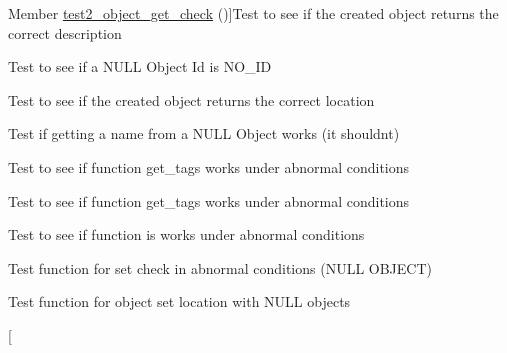 \begin{DoxyRefList}
\hypertarget{test__test000163}{}%
Member \hyperlink{object__test_8h_a0a46a923bd913c88dc697341d19cfb2b}{test2\+\_\+object\+\_\+get\+\_\+check} ()]Test to see if the created object returns the correct description  
\item[\label{test__test000159}%
\hypertarget{test__test000159}{}%
Member \hyperlink{object__test_8h_a1ff250f0f43297f57fcce1f3a6ae490b}{test2\+\_\+object\+\_\+get\+\_\+id} ()]Test to see if a N\+U\+LL Object Id is N\+O\+\_\+\+ID  
\item[\label{test__test000161}%
\hypertarget{test__test000161}{}%
Member \hyperlink{object__test_8h_aa8e3d1f2c80097572d9a453737d8cd44}{test2\+\_\+object\+\_\+get\+\_\+location} ()]Test to see if the created object returns the correct location  
\item[\label{test__test000157}%
\hypertarget{test__test000157}{}%
Member \hyperlink{object__test_8h_abdfafbc7b8588d3dcdb05fd2beb2397e}{test2\+\_\+object\+\_\+get\+\_\+name} ()]Test if getting a name from a N\+U\+LL Object works (it shouldn\textquotesingle{}t)  
\item[\label{test__test000167}%
\hypertarget{test__test000167}{}%
Member \hyperlink{object__test_8h_a9cca45e17438fe1a0948c2e9c75f81d3}{test2\+\_\+object\+\_\+get\+\_\+tags} ()]Test to see if function get\+\_\+tags works under abnormal conditions  
\item[\label{test__test000169}%
\hypertarget{test__test000169}{}%
Member \hyperlink{object__test_8h_a84f299de87c8e600980581758183115d}{test2\+\_\+object\+\_\+get\+\_\+tags\+\_\+number} ()]Test to see if function get\+\_\+tags works under abnormal conditions  
\item[\label{test__test000171}%
\hypertarget{test__test000171}{}%
Member \hyperlink{object__test_8h_ab9377287e979599b63de60a17b6023bb}{test2\+\_\+object\+\_\+is} ()]Test to see if function is works under abnormal conditions  
\item[\label{test__test000155}%
\hypertarget{test__test000155}{}%
Member \hyperlink{object__test_8h_a16f5685f75ace0aaaeef2b296d64221d}{test2\+\_\+object\+\_\+set\+\_\+check} ()]Test function for set check in abnormal conditions (N\+U\+LL O\+B\+J\+E\+CT)  
\item[\label{test__test000152}%
\hypertarget{test__test000152}{}%
Member \hyperlink{object__test_8h_a552de466dc09eaef60eff5835455fbb6}{test2\+\_\+object\+\_\+set\+\_\+location} ()]Test function for object set location with N\+U\+LL objects  
\item[\label{test__test000149}%
\hypertarget{test__test000149}{}%

\end{DoxyRefList}
